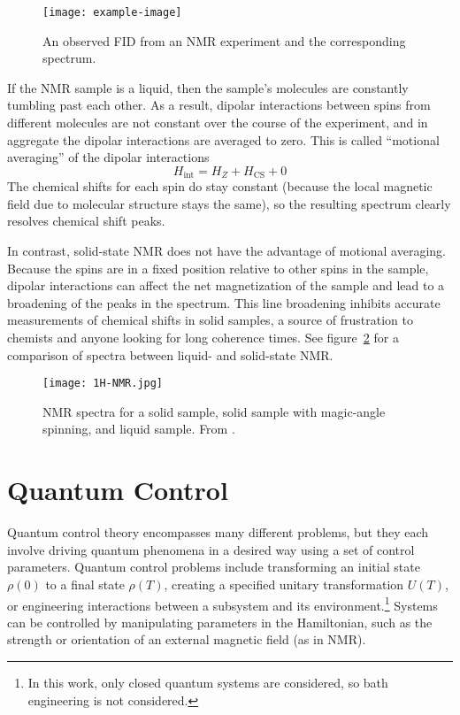 \begin{figure}[H]
    \centering
    \texttt{[image: example-image]}
    \caption{An observed FID from an NMR experiment and the corresponding spectrum.}
    \label{fig:NMR-FID-spectrum}
\end{figure}


If the NMR sample is a liquid, then the sample's molecules are constantly tumbling past each other. As a result, dipolar interactions between spins from different molecules are not constant over the course of the experiment, and in aggregate the dipolar interactions are averaged to zero. This is called ``motional averaging'' of the dipolar interactions
\[
H_{\text{int}} = H_Z + H_\text{CS} + 0
\]
The chemical shifts for each spin do stay constant (because the local magnetic field due to molecular structure stays the same), so the resulting spectrum clearly resolves chemical shift peaks.

In contrast, solid-state NMR does not have the advantage of motional averaging. Because the spins are in a fixed position relative to other spins in the sample, dipolar interactions can affect the net magnetization of the sample and lead to a broadening of the peaks in the spectrum. This line broadening inhibits accurate measurements of chemical shifts in solid samples, a source of frustration to chemists and anyone looking for long coherence times. See figure~\ref{fig:NMR-averaging} for a comparison of spectra between liquid- and solid-state NMR.

\begin{figure}[H]
    \centering
    \texttt{[image: 1H-NMR.jpg]}
    \caption{NMR spectra for a solid sample, solid sample with magic-angle spinning, and liquid sample. From \cite{Ottowa-NMR}.}
    \label{fig:NMR-averaging}
\end{figure}

\section{Quantum Control}

Quantum control theory encompasses many different problems, but they each involve driving quantum phenomena in a desired way using a set of control parameters. Quantum control problems include transforming an initial state $\rho(0)$ to a final state $\rho(T)$, creating a specified unitary transformation $U(T)$, or engineering interactions between a subsystem and its environment.\cite{Dong_2010}\footnote{In this work, only closed quantum systems are considered, so bath engineering is not considered.} Systems can be controlled by manipulating parameters in the Hamiltonian, such as the strength or orientation of an external magnetic field (as in NMR).

